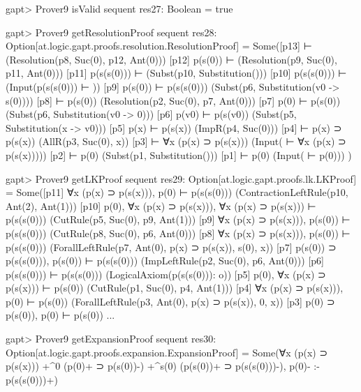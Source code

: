 \documentclass[a4paper,11pt]{article}
\begin{document}
\begin{clilisting}
gapt> Prover9 isValid sequent
res27: Boolean = true

gapt> Prover9 getResolutionProof sequent
res28: Option[at.logic.gapt.proofs.resolution.ResolutionProof] =
Some([p13]  ⊢    (Resolution(p8, Suc(0), p12, Ant(0)))
[p12] p(s(0)) ⊢    (Resolution(p9, Suc(0), p11, Ant(0)))
[p11] p(s(s(0))) ⊢    (Subst(p10, Substitution()))
[p10] p(s(s(0))) ⊢    (Input(p(s(s(0))) ⊢ ))
[p9] p(s(0)) ⊢ p(s(s(0)))   (Subst(p6, Substitution(v0 -> s(0))))
[p8]  ⊢ p(s(0))   (Resolution(p2, Suc(0), p7, Ant(0)))
[p7] p(0) ⊢ p(s(0))   (Subst(p6, Substitution(v0 -> 0)))
[p6] p(v0) ⊢ p(s(v0))   (Subst(p5, Substitution(x -> v0)))
[p5] p(x) ⊢ p(s(x))   (ImpR(p4, Suc(0)))
[p4]  ⊢ p(x) ⊃ p(s(x))   (AllR(p3, Suc(0), x))
[p3]  ⊢ ∀x (p(x) ⊃ p(s(x)))   (Input( ⊢ ∀x (p(x) ⊃ p(s(x)))))
[p2]  ⊢ p(0)   (Subst(p1, Substitution()))
[p1]  ⊢ p(0)   (Input( ⊢ p(0)))
)

gapt> Prover9 getLKProof sequent
res29: Option[at.logic.gapt.proofs.lk.LKProof] =
Some([p11] ∀x (p(x) ⊃ p(s(x))), p(0) ⊢ p(s(s(0)))    (ContractionLeftRule(p10, Ant(2), Ant(1)))
[p10] p(0), ∀x (p(x) ⊃ p(s(x))), ∀x (p(x) ⊃ p(s(x))) ⊢ p(s(s(0)))    (CutRule(p5, Suc(0), p9, Ant(1)))
[p9] ∀x (p(x) ⊃ p(s(x))), p(s(0)) ⊢ p(s(s(0)))    (CutRule(p8, Suc(0), p6, Ant(0)))
[p8] ∀x (p(x) ⊃ p(s(x))), p(s(0)) ⊢ p(s(s(0)))    (ForallLeftRule(p7, Ant(0), p(x) ⊃ p(s(x)), s(0), x))
[p7] p(s(0)) ⊃ p(s(s(0))), p(s(0)) ⊢ p(s(s(0)))    (ImpLeftRule(p2, Suc(0), p6, Ant(0)))
[p6] p(s(s(0))) ⊢ p(s(s(0)))    (LogicalAxiom(p(s(s(0))): o))
[p5] p(0), ∀x (p(x) ⊃ p(s(x))) ⊢ p(s(0))    (CutRule(p1, Suc(0), p4, Ant(1)))
[p4] ∀x (p(x) ⊃ p(s(x))), p(0) ⊢ p(s(0))    (ForallLeftRule(p3, Ant(0), p(x) ⊃ p(s(x)), 0, x))
[p3] p(0) ⊃ p(s(0)), p(0) ⊢ p(s(0))  ...

gapt> Prover9 getExpansionProof sequent
res30: Option[at.logic.gapt.proofs.expansion.ExpansionProof] =
Some(∀x (p(x) ⊃ p(s(x))) +^{0} (p(0)+ ⊃ p(s(0))-) +^{s(0)} (p(s(0))+ ⊃ p(s(s(0)))-),
p(0)-
:-
p(s(s(0)))+)

\end{clilisting}
\end{document}
